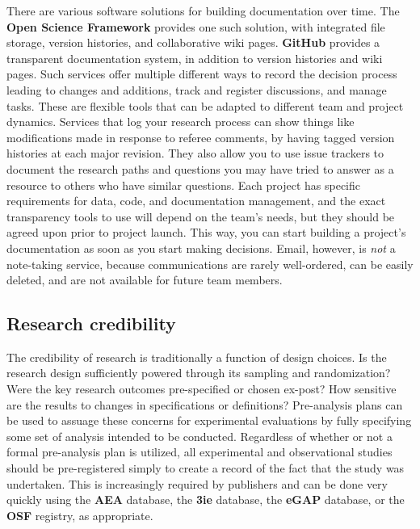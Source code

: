 There are various software solutions for building documentation over time.
The \textbf{Open Science Framework} provides one such solution,
with integrated file storage, version histories, and collaborative wiki pages.
\textbf{GitHub} provides a transparent documentation system,
in addition to version histories and wiki pages.
Such services offer multiple different ways
to record the decision process leading to changes and additions,
track and register discussions, and manage tasks.
These are flexible tools that can be adapted to different team and project dynamics.
Services that log your research process can show things like modifications made in response to referee comments,
by having tagged version histories at each major revision.
They also allow you to use issue trackers
to document the research paths and questions you may have tried to answer
as a resource to others who have similar questions.
Each project has specific requirements for data, code, and documentation management,
and the exact transparency tools to use will depend on the team's needs,
but they should be agreed upon prior to project launch.
This way, you can start building a project's documentation as soon as you start making decisions.
Email, however, is \textit{not} a note-taking service, because communications are rarely well-ordered,
can be easily deleted, and are not available for future team members.

\subsection{Research credibility}


The credibility of research is traditionally a function of design choices.\cite{angrist2010credibility,ioannidis2005most}
Is the research design sufficiently powered through its sampling and randomization?
Were the key research outcomes pre-specified or chosen ex-post?
How sensitive are the results to changes in specifications or definitions?
Pre-analysis plans can be used to assuage these concerns for experimental evaluations
by fully specifying some set of analysis intended to be conducted.
Regardless of whether or not a formal pre-analysis plan is utilized,
all experimental and observational studies should be pre-registered
simply to create a record of the fact that the study was undertaken.
This is increasingly required by publishers and can be done very quickly
using the \textbf{AEA} database,
the \textbf{3ie} database,
the \textbf{eGAP} database,
or the \textbf{OSF} registry, as appropriate.

